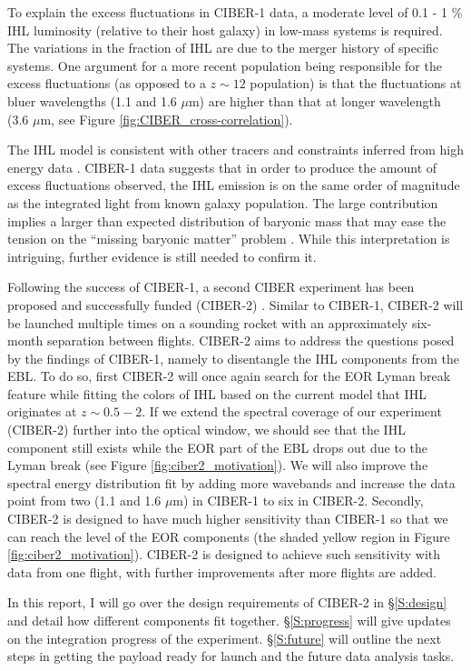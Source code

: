 To explain the excess fluctuations in CIBER-1 data, a moderate level of 0.1 - 1 \% IHL luminosity (relative to their host galaxy) in low-mass systems is required. The variations in the fraction of IHL are due to the merger history of specific systems. One argument for a more recent population being responsible for the excess fluctuations (as opposed to a $z\sim12$ population) is that the fluctuations at bluer wavelengths (1.1 and 1.6 $\mu$m) are higher than that at longer wavelength (3.6 $\mu$m, see Figure \ref{fig:CIBER_cross-correlation}). 

The IHL model is consistent with other tracers \citep{Schroedter2005} and constraints inferred from high energy data \citep{HESS2013}. CIBER-1 data suggests that in order to produce the amount of excess fluctuations observed, the IHL emission is on the same order of magnitude as the integrated light from known galaxy population. The large contribution implies a larger than expected distribution of baryonic mass that may ease the tension on the ``missing baryonic matter'' problem \citep{Ashman1992,Bock1998}. While this interpretation is intriguing, further evidence is still needed to confirm it.

Following the success of CIBER-1, a second CIBER experiment has been proposed and successfully funded (CIBER-2) \citep{Lanz2014}. Similar to CIBER-1, CIBER-2 will be launched multiple times on a sounding rocket with an approximately six-month separation between flights.
CIBER-2 aims to address the questions posed by the findings of CIBER-1, namely to disentangle the IHL components from the EBL. To do so, first CIBER-2 will once again search for the EOR Lyman break feature while fitting the colors of IHL based on the current model that IHL originates at $z \sim 0.5 - 2$.
If we extend the spectral coverage of our experiment (CIBER-2) further into the optical window, we should see that the IHL component still exists while the EOR part of the EBL drops out due to the Lyman break (see Figure \ref{fig:ciber2_motivation}). We will also improve the spectral energy distribution fit by adding more wavebands and increase the data point from two (1.1 and 1.6 $\mu$m) in CIBER-1 to six in CIBER-2. Secondly, CIBER-2 is designed to have much higher sensitivity than CIBER-1 so that we can reach the level of the EOR components (the shaded yellow region in Figure \ref{fig:ciber2_motivation}). CIBER-2 is designed to achieve such sensitivity with data from one flight, with further improvements after more flights are added.

In this report, I will go over the design requirements of CIBER-2 in \S\ref{S:design} and detail how different components fit together. \S\ref{S:progress} will give updates on the integration progress of the experiment. \S\ref{S:future} will outline the next steps in getting the payload ready for launch and the future data analysis tasks.
 

